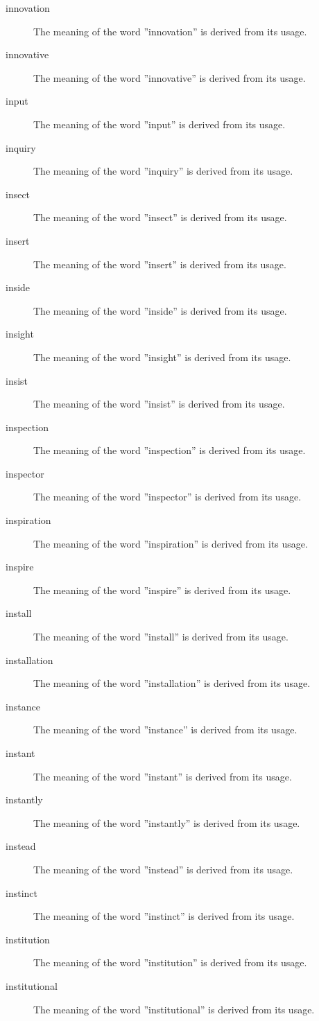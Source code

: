 \documentclass[12pt, letterpaper]{memoir}
\begin{document}
\begin{description}
\item[innovation] The meaning of the word ''innovation'' is derived from its usage.
\item[innovative] The meaning of the word ''innovative'' is derived from its usage.
\item[input] The meaning of the word ''input'' is derived from its usage.
\item[inquiry] The meaning of the word ''inquiry'' is derived from its usage.
\item[insect] The meaning of the word ''insect'' is derived from its usage.
\item[insert] The meaning of the word ''insert'' is derived from its usage.
\item[inside] The meaning of the word ''inside'' is derived from its usage.
\item[insight] The meaning of the word ''insight'' is derived from its usage.
\item[insist] The meaning of the word ''insist'' is derived from its usage.
\item[inspection] The meaning of the word ''inspection'' is derived from its usage.
\item[inspector] The meaning of the word ''inspector'' is derived from its usage.
\item[inspiration] The meaning of the word ''inspiration'' is derived from its usage.
\item[inspire] The meaning of the word ''inspire'' is derived from its usage.
\item[install] The meaning of the word ''install'' is derived from its usage.
\item[installation] The meaning of the word ''installation'' is derived from its usage.
\item[instance] The meaning of the word ''instance'' is derived from its usage.
\item[instant] The meaning of the word ''instant'' is derived from its usage.
\item[instantly] The meaning of the word ''instantly'' is derived from its usage.
\item[instead] The meaning of the word ''instead'' is derived from its usage.
\item[instinct] The meaning of the word ''instinct'' is derived from its usage.
\item[institution] The meaning of the word ''institution'' is derived from its usage.
\item[institutional] The meaning of the word ''institutional'' is derived from its usage.

\end{description}
\end{document}
